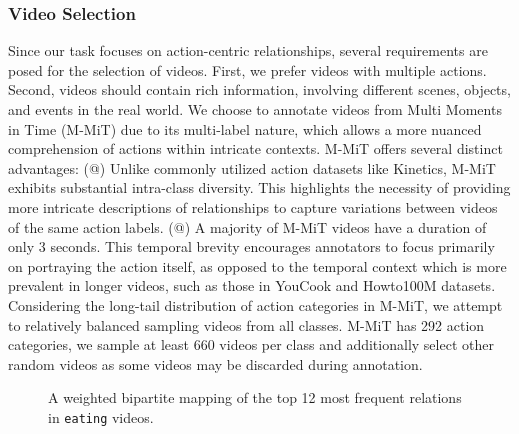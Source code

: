 \documentclass[letterpaper]{article}
\makeatletter
\newcommand{\Rmnum}[1]{\expandafter\@slowromancap\romannumeral #1@}
\makeatother
\begin{document}
\subsubsection{Video Selection}
Since our task focuses on action-centric relationships, several requirements are posed for the selection of videos.
First, we prefer videos with multiple actions. Second, videos should contain rich information, involving different scenes, objects, and events in the real world.
We choose to annotate videos from Multi Moments in Time (M-MiT) \cite{9609554} due to its multi-label nature, which allows a more nuanced comprehension of actions within intricate contexts.
M-MiT offers several distinct advantages:
(\Rmnum{1}) Unlike commonly utilized action datasets like Kinetics, M-MiT exhibits substantial intra-class diversity. This highlights the necessity of providing more intricate descriptions of relationships to capture variations between videos of the same action labels.
(\Rmnum{2}) A majority of M-MiT videos have a duration of only 3 seconds. This temporal brevity encourages annotators to focus primarily on portraying the action itself, as opposed to the temporal context which is more prevalent in longer videos, such as those in YouCook and Howto100M datasets.
Considering the long-tail distribution of action categories in M-MiT, we attempt to relatively balanced sampling videos from all classes. M-MiT has 292 action categories, we sample at least 660 videos per class and additionally select other random videos as some videos may be discarded during annotation.
\begin{figure}[t]
\centering
{}
\caption{A weighted bipartite mapping of the top 12 most frequent relations in \texttt{eating} videos.}
\label{fig:sanki}
\end{figure}
\end{document}
